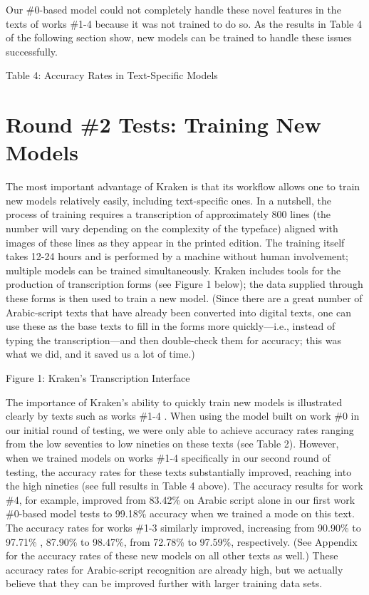 Our \#0-based model could not completely handle these novel features in the texts of works \#1-4 because it was not trained to do so. As the results in Table 4 of the following section show, new models can be trained to handle these issues successfully.

Table 4: Accuracy Rates in Text-Specific Models  


\section{Round \#2 Tests: Training New Models}


The most important advantage of Kraken is that its workflow allows one to train
new models relatively easily, including text-specific ones. In a nutshell, the
process of training requires a transcription of approximately 800 lines (the
number will vary depending on the complexity of the typeface) aligned with
images of these lines as they appear in the printed edition. The training
itself takes 12-24 hours and is performed by a machine without human
involvement; multiple models can be trained simultaneously. Kraken includes
tools for the production of transcription forms (see Figure 1 below); the data
supplied through these forms is then used to train a new model. (Since there
are a great number of Arabic-script texts that have already been converted into
digital texts, one can use these as the base texts to fill in the forms more
quickly—i.e., instead of typing the transcription—and then double-check them
for accuracy; this was what we did, and it saved us a lot of time.)


Figure 1: Kraken’s Transcription Interface  


The importance of Kraken’s ability to quickly train new models is illustrated
clearly by texts such as works \#1-4 . When using the model built on work \#0 in
our initial round of testing, we were only able to achieve accuracy rates
ranging from the low seventies to low nineties on these texts (see Table 2).
However, when we trained models on works \#1-4 specifically in our second round
of testing, the accuracy rates for these texts substantially improved, reaching
into the high nineties (see full results in Table 4 above). The accuracy
results for work \#4, for example, improved from 83.42\% on Arabic script alone
in our first work \#0-based model tests to 99.18\% accuracy when we trained a
mode on this text. The accuracy rates for works \#1-3 similarly improved,
increasing from 90.90\% to 97.71\% , 87.90\% to 98.47\%, from 72.78\% to
97.59\%, respectively. (See Appendix for the accuracy rates of these new models
on all other texts as well.) These accuracy rates for Arabic-script recognition
are already high, but we actually believe that they can be improved further
with larger training data sets.

